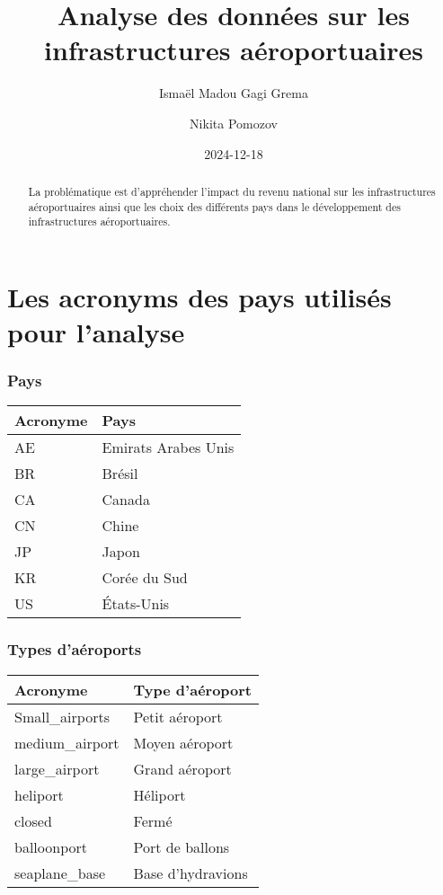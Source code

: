 \documentclass[
]{compterendu}
\title{Analyse des données sur les infrastructures aéroportuaires}
\author{Ismaël Madou Gagi Grema \and Nikita Pomozov}
\date{2024-12-18}
\begin{document}
\maketitle
\begin{abstract}
La problématique est d'appréhender l'impact du revenu national sur les
infrastructures aéroportuaires ainsi que les choix des différents pays
dans le développement des infrastructures aéroportuaires.
\end{abstract}

{
\setcounter{tocdepth}{2}
\tableofcontents
}
\section{\texorpdfstring{\textbf{Les acronyms des pays utilisés pour
l'analyse}}{Les acronyms des pays utilisés pour l'analyse}}\label{les-acronyms-des-pays-utilisuxe9s-pour-lanalyse}

\subsubsection{Pays}\label{pays}

\begin{longtable}[]{@{}ll@{}}
\toprule\noalign{}
Acronyme & Pays \\
\midrule\noalign{}
\endhead
\bottomrule\noalign{}
\endlastfoot
AE & Emirats Arabes Unis \\
BR & Brésil \\
CA & Canada \\
CN & Chine \\
JP & Japon \\
KR & Corée du Sud \\
US & États-Unis \\
\end{longtable}

\subsubsection{Types d'aéroports}\label{types-dauxe9roports}

\begin{longtable}[]{@{}ll@{}}
\toprule\noalign{}
Acronyme & Type d'aéroport \\
\midrule\noalign{}
\endhead
\bottomrule\noalign{}
\endlastfoot
Small\_airports & Petit aéroport \\
medium\_airport & Moyen aéroport \\
large\_airport & Grand aéroport \\
heliport & Héliport \\
closed & Fermé \\
balloonport & Port de ballons \\
seaplane\_base & Base d'hydravions \\
\end{longtable}
\end{document}
